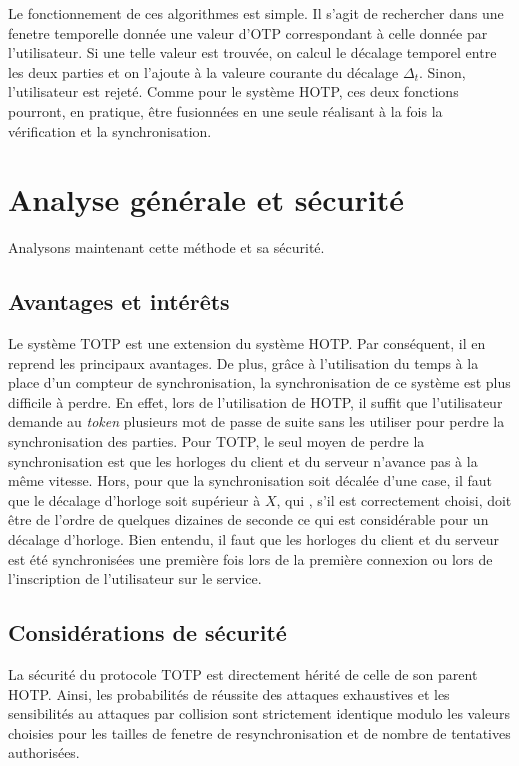 \documentclass{../res/univ-projet}
\begin{document}
    Le fonctionnement de ces algorithmes est simple. Il s'agit de rechercher dans une fenetre temporelle donnée une valeur d'OTP correspondant à celle donnée par 
    l'utilisateur. Si une telle valeur est trouvée, on calcul le décalage temporel entre les deux parties et on l'ajoute à la valeure courante du décalage $\Delta_t$.
    Sinon, l'utilisateur est rejeté.
    Comme pour le système \og{}HOTP\fg{}, ces deux fonctions pourront, en pratique, \^etre fusionnées en une seule réalisant à la fois la vérification et la 
    synchronisation.
  
\section{Analyse générale et sécurité}
Analysons maintenant cette méthode et sa sécurité.

  \subsection{Avantages et intér\^ets}
  Le système \og{}TOTP\fg{} est une extension du système \og{}HOTP\fg{}. Par conséquent, il en reprend les principaux avantages. De plus, gr\^ace à l'utilisation du temps 
  à la place d'un compteur de synchronisation, la synchronisation de ce système est plus difficile à perdre. En effet, lors de l'utilisation de \og{}HOTP\fg{}, il suffit 
  que l'utilisateur demande au \emph{token} plusieurs mot de passe de suite sans les utiliser pour perdre la synchronisation des parties. Pour \og{}TOTP\fg{}, le seul 
  moyen de perdre la synchronisation est que les horloges du client et du serveur n'avance pas à la m\^eme vitesse. Hors, pour que la synchronisation soit décalée d'une 
  \og{}case\fg{}, il faut que le décalage d'horloge soit supérieur à $X$, qui , s'il est correctement choisi, doit \^etre de l'ordre de quelques dizaines de seconde
  ce qui est considérable pour un décalage d'horloge. Bien entendu, il faut que les horloges du client et du serveur est été synchronisées une première fois lors de 
  la première connexion ou lors de l'inscription de l'utilisateur sur le service.
  
  \subsection{Considérations de sécurité}
  La sécurité du protocole TOTP est directement hérité de celle de son parent HOTP. Ainsi, les probabilités de réussite des attaques exhaustives et les sensibilités au attaques 
  par collision sont strictement identique modulo les valeurs choisies pour les tailles de fenetre de resynchronisation et de nombre de tentatives authorisées.
  
\end{document}
